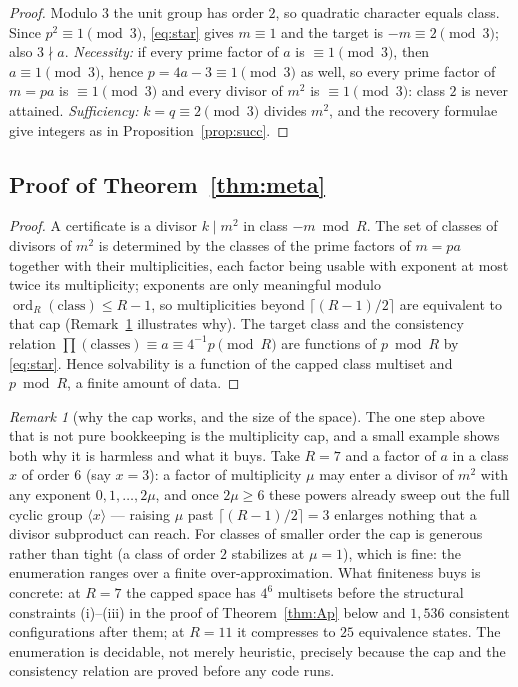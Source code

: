 \documentclass[11pt]{article}
\theoremstyle{plain}
\theoremstyle{remark}
\newtheorem{remark}[theorem]{Remark}
\theoremstyle{plain}
\numberwithin{equation}{section}
\DeclareMathOperator{\ord}{ord}
\begin{document}
\begin{proof}
Modulo $3$ the unit group has order $2$, so quadratic character equals
class. Since $p^2 \equiv 1 \pmod 3$, \eqref{eq:star} gives $m \equiv 1$
and the target is $-m \equiv 2 \pmod 3$; also $3 \nmid a$.
\emph{Necessity:} if every prime factor of $a$ is $\equiv 1 \pmod 3$, then
$a \equiv 1 \pmod 3$, hence $p = 4a - 3 \equiv 1 \pmod 3$ as well, so
every prime factor of $m = pa$ is $\equiv 1 \pmod 3$ and every divisor of
$m^2$ is $\equiv 1 \pmod 3$: class $2$ is never attained.
\emph{Sufficiency:} $k = q \equiv 2 \pmod 3$ divides $m^2$, and the
recovery formulae give integers as in Proposition~\ref{prop:succ}.
\end{proof}

\subsection{Proof of Theorem~\ref{thm:meta}}

\begin{proof}
A certificate is a divisor $k \mid m^2$ in class $-m \bmod R$. The set of
classes of divisors of $m^2$ is determined by the classes of the prime
factors of $m = pa$ together with their multiplicities, each factor being
usable with exponent at most twice its multiplicity; exponents are only
meaningful modulo $\ord_R(\text{class}) \le R - 1$, so multiplicities
beyond $\lceil (R-1)/2 \rceil$ are equivalent to that cap
(Remark~\ref{rem:cap} illustrates why). The target
class and the consistency relation $\prod (\text{classes}) \equiv a \equiv
4^{-1} p \pmod R$ are functions of $p \bmod R$ by \eqref{eq:star}. Hence
solvability is a function of the capped class multiset and $p \bmod R$, a
finite amount of data.
\end{proof}

\begin{remark}[why the cap works, and the size of the space]
\label{rem:cap}
The one step above that is not pure bookkeeping is the multiplicity
cap, and a small example shows both why it is harmless and what it
buys. Take $R = 7$ and a factor of $a$ in a class $x$ of order $6$
(say $x = 3$): a factor of multiplicity $\mu$ may enter a divisor of
$m^2$ with any exponent $0, 1, \dots, 2\mu$, and once $2\mu \ge 6$
these powers already sweep out the full cyclic group
$\langle x \rangle$ --- raising $\mu$ past
$\lceil (R-1)/2 \rceil = 3$ enlarges nothing that a divisor subproduct
can reach. For classes of smaller order the cap is generous rather
than tight (a class of order $2$ stabilizes at $\mu = 1$), which is
fine: the enumeration ranges over a finite over-approximation. What
finiteness buys is concrete: at $R = 7$ the capped space has
$4^6$ multisets before the structural constraints (i)--(iii) in the
proof of Theorem~\ref{thm:Ap} below and $1{,}536$ consistent
configurations after them; at $R = 11$ it compresses to $25$
equivalence states. The
enumeration is decidable, not merely heuristic, precisely because the
cap and the consistency relation are proved before any code runs.
\end{remark}
\end{document}
